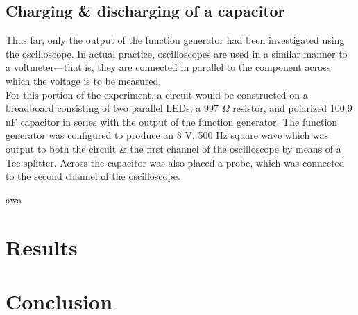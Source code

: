 \documentclass{article}
\begin{document}


    \subsection{Charging \& discharging of a capacitor}
        Thus far, only the output of the function generator had been investigated using the oscilloscope. In actual practice, oscilloscopes are used in a similar manner to a voltmeter---that is, they are connected in parallel to the component across which the voltage is to be measured. \\%
        For this portion of the experiment, a circuit would be constructed on a breadboard consisting of two parallel LEDs, a 997 $\Omega$ resistor, and polarized 100.9 nF capacitor in series with the output of the function generator.
        The function generator was configured to produce an 8 V, 500 Hz square wave which was output to both the circuit \& the first channel of the oscilloscope by means of a Tee-splitter.
        Across the capacitor was also placed a probe, which was connected to the second channel of the oscilloscope.

        \begin{figure}
        \end{figure}

        awa



\section{Results}
\begin{table}
    
\end{table}

\section{Conclusion}
\end{document}
